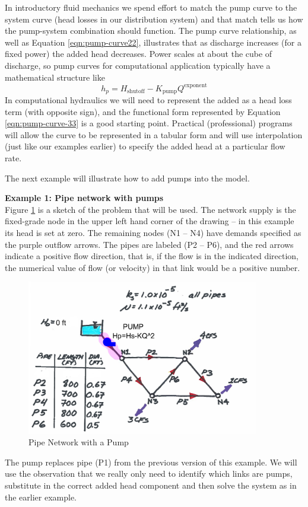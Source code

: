 In introductory fluid mechanics we spend effort to match the pump curve to the system curve (head losses in our distribution system) and that match tells us how the pump-system combination should function.   
The pump curve relationship, as well as Equation \ref{eqn:pump-curve22}, illustrates that as discharge increases (for a fixed power) the added head decreases.
Power scales at about the cube of discharge, so pump curves for computational application typically have a mathematical structure like
\begin{equation}
h_p =  H_{\text{shutoff}} - K_{\text{pump}}Q^{\text{exponent}}
\label{eqn:pump-curve-33}
\end{equation}
In computational hydraulics we will need to represent the added as a head loss term (with opposite sign), and the functional form represented by Equation \ref{eqn:pump-curve-33} is a good starting point.  
Practical (professional) programs will allow the curve to be represented in a tabular form and will use interpolation (just like our examples earlier) to specify the added head at a particular flow rate.

The next example will illustrate how to add pumps into the model.

\textbf{Example 1: Pipe network with pumps}\\
Figure \ref{fig:pipe-net-pumps} is a sketch of the problem that will be used.  
The network supply is the fixed-grade node in the upper left hand corner of the drawing -- in this example its head is set at zero.  
The remaining nodes (N1 -- N4) have demands specified as the purple outflow arrows.
The pipes are labeled (P2 -- P6), and the red arrows indicate a positive flow direction, that is, if the flow is in the indicated direction, the numerical value of flow (or velocity) in that link would be a positive number.
\begin{figure}[h!] %
   \centering
   \includegraphics[width=4in]{./10-PumpsAndValves/pipe-net-pumps.jpg} 
   \caption{Pipe Network with a Pump}
   \label{fig:pipe-net-pumps}
\end{figure}
The pump replaces pipe (P1) from the previous version of this example.  
We will use the observation that we really only need to identify which links are pumps, substitute in the correct added head component and then solve the system as in the earlier example.   


